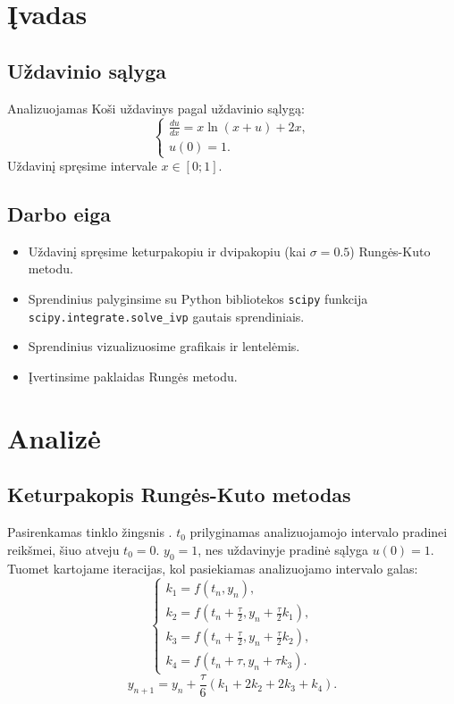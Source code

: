 \documentclass[]{VUMIFTemplateClass}
\begin{document}
\onehalfspacing


\tableofcontents
\onehalfspacing

\section{Įvadas}

\subsection{Uždavinio sąlyga}
Analizuojamas Koši uždavinys pagal uždavinio sąlygą:
\begin{equation}
    \begin{cases}
        \frac{du}{dx} = x \ln(x + u) + 2x,\\
        u(0) = 1.
    \end{cases}
\end{equation}
Uždavinį spręsime intervale $x \in [0; 1]$.

\subsection{Darbo eiga}
\begin{itemize}
    \item Uždavinį spręsime keturpakopiu ir dvipakopiu (kai $\sigma = 0.5$) Rungės-Kuto metodu.
    \item Sprendinius palyginsime su Python bibliotekos \texttt{scipy} funkcija \texttt{scipy.integrate.solve\_ivp} gautais sprendiniais.
    \item Sprendinius vizualizuosime grafikais ir lentelėmis.
    \item Įvertinsime paklaidas Rungės metodu.
\end{itemize}

\section{Analizė}
\subsection{Keturpakopis Rungės-Kuto metodas}
Pasirenkamas tinklo žingsnis \tau. $t_0$ prilyginamas analizuojamojo intervalo pradinei reikšmei, šiuo atveju $t_0 = 0$. $y_0 = 1$, nes uždavinyje pradinė sąlyga $u(0) = 1$. Tuomet kartojame iteracijas, kol pasiekiamas analizuojamo intervalo galas:
\begin{equation}
    \begin{cases}
        k_1 = f(t_n, y_n),\\
        k_2 = f(t_n + \frac{\tau}{2}, y_n + \frac{\tau}{2} k_1),\\
        k_3 = f(t_n + \frac{\tau}{2}, y_n + \frac{\tau}{2} k_2),\\
        k_4 = f(t_n + \tau, y_n + \tau k_3).
    \end{cases}
\end{equation}
\[ y_{n+1} = y_n + \frac{\tau}{6}(k_1 + 2k_2 + 2k_3 + k_4). \]
\end{document}
